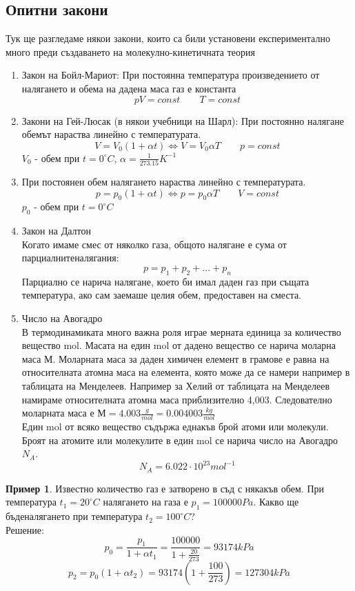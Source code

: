 \documentclass[fleqn, 12pt]{article}
\theoremstyle{definition}
\newtheorem{example}{Пример}[subsection]
\begin{document}
\subsection{Опитни закони}
Тук ще разгледаме някои закони, които са били установени експериментално много преди създаването на молекулно-кинетичната теория 
\begin{enumerate}
\item Закон на Бойл-Мариот: При постоянна температура произведението от налягането и обема на дадена маса газ е константа 
$$pV = const \qquad T = const$$
\item Закони на Гей-Люсак (в някои учебници на Шарл): При постоянно налягане обемът нараства линейно с температурата.
$$V = V_0(1 + \alpha t) \Leftrightarrow V = V_0 \alpha T \qquad p = const$$
$V_0$ - обем при $t = 0^\circ C$, $\alpha = \frac{1}{273.15}K^{-1}$
\item При постоянен обем налягането нараства линейно с температурата.
$$p = p_0(1 + \alpha t) \Leftrightarrow p = p_0 \alpha T \qquad V = const$$
$p_0$ - обем при $t = 0^\circ C$
\item Закон на Далтон\\
Когато имаме смес от няколко газа, общото налягане е сума от парциалнитеналягания:
$$p = p_1 + p_2 + ... + p_n$$
Парциално се нарича налягане, което би имал
даден газ при същата температура, ако сам заемаше целия обем, предоставен на сместа.
\item Число на Авогадро\\
В термодинамиката много важна роля играе мерната единица за количество
вещество mol. Масата на един mol от дадено вещество се нарича моларна маса М.
Моларната маса за даден химичен елемент в грамове е равна на относителната атомна
маса на елемента, която може да се намери например в таблицата на Менделеев.
Например за Хелий от таблицата на Менделеев намираме относителната атомна маса
приблизително 4,003. Следователно моларната маса е
$М = 4.003 \frac{g}{mol} = 0.004003 \frac{kg}{mol}$ \\
Един mol от всяко вещество съдържа еднакъв брой атоми или молекули. Броят
на атомите или молекулите в един mol се нарича число на Авогадро $N_A$.
$$N_A = 6.022 \cdot 10^{23} mol^{-1}$$
\end{enumerate}

\begin{example}
Известно количество газ е затворено в съд с някакъв обем. При температура $t_1 = 20^\circ C$
налягането на газа е $ p_1 = 100000 Pa $. Какво ще бъденалягането при температура $t_2 = 100^\circ C$?\\
Решение: \\
$$p_0 = \frac{p_1}{1 + \alpha t_1} = \frac{100000}{1 + \frac{20}{273}} = 93174 kPa$$
$$p_2 =p_0(1 + \alpha t_2) = 93174 (1 + \frac{100}{273}) = 127304 kPa$$
\end{example}
\end{document}
